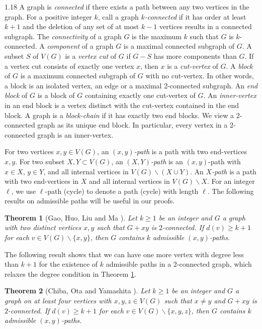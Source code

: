 \documentclass[10pt]{article}
\newtheorem{theorem}{Theorem}[section]
\begin{document}
\begin{spacing}{1.18}
    A graph is {\em connected} if there exists a path between any two vertices in the graph. For a positive integer $k$, call a graph {\em $k$-connected} if it has order at least $k+1$ and the deletion of any set of at most $k-1$ vertices results in a connected subgraph. The {\em connectivity} of a graph $G$ is the maximum $k$ such that $G$ is $k$-connected. A {\em component} of a graph $G$ is a maximal connected subgraph of $G$. A subset $S$ of $V(G)$ is a {\em vertex cut} of $G$ if $G-S$ has more components than $G$. If a vertex cut consists of exactly one vertex $x$, then $x$ is a {\em cut-vertex} of $G$. A {\em block} of $G$ is a maximum connected subgraph of $G$ with no cut-vertex. In other words, a block is an isolated vertex, an edge or a maximal 2-connected subgraph. An {\em end block} of $G$ is a block of $G$ containing exactly one cut-vertex of $G$. An {\em inner-vertex} in an end block is a vertex distinct with the cut-vertex contained in the end block. 
    A graph is a {\em block-chain} if it has exactly two end blocks.
    We view a 2-connected graph as its unique end block. In particular, every vertex in a 2-connected graph is an inner-vertex. 

    For two vertices $x,y\in V(G)$, an \textit{$(x,y)$-path} is a path with two end-vertices $x,y$. For two subset $X,Y\subset V(G)$, an \textit{$(X,Y)$-path} is an $(x,y)$-path with $x\in X$, $y\in Y$, and all internal vertices in $V(G)\backslash(X\cup Y)$. An \textit{$X$-path} is a path with two end-vertices in $X$ and all internal vertices in $V(G)\backslash X$.
    For an integer $\ell$, we use $\ell$-path (cycle) to denote a path (cycle) with length $\ell$. The following results on admissible paths will be useful in our proofs.

\begin{theorem}[Gao, Huo, Liu and Ma \cite{G+22}]\label{thm: k adm paths}
    Let $k\geqslant 1$ be an integer and $G$ a graph with two distinct vertices $x,y$ such that $G+xy$ is $2$-connected. If $d(v)\geqslant k+1$ for each $v\in V(G)\backslash \{x,y\}$, then $G$ contains $k$ admissible $(x,y)$-paths.
\end{theorem}

    The following result shows that we can have one more vertex with degree less than $k+1$ for the existence of $k$ admissible paths in a 2-connected graph, which relaxes the degree condition in Theorem \ref{thm: k adm paths}. 

\begin{theorem}[Chiba, Ota and Yamashita \cite{COY22}]\label{thm: k adm paths 2}
    Let $k\geqslant 1$ be an integer and $G$ a graph on at least four vertices with $x,y,z\in V(G)$ such that $x\neq y$ and $G+xy$ is $2$-connected. If $d(v)\geqslant k+1$ for each $v\in V(G)\backslash \{x,y,z\}$, then $G$ contains $k$ admissible $(x,y)$-paths.
\end{theorem}





\end{spacing}
\end{document}
